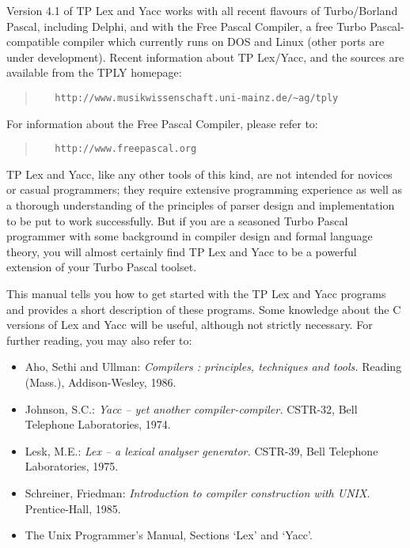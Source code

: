Version 4.1 of TP Lex and Yacc works with all recent flavours of Turbo/Borland
Pascal, including Delphi, and with the Free Pascal Compiler, a free Turbo
Pascal-compatible compiler which currently runs on DOS and Linux (other ports
are under development). Recent information about TP Lex/Yacc, and the sources
are available from the TPLY homepage:
\begin{quote}\begin{verbatim}
   http://www.musikwissenschaft.uni-mainz.de/~ag/tply
\end{verbatim}\end{quote}
For information about the Free Pascal Compiler, please refer to:
\begin{quote}\begin{verbatim}
   http://www.freepascal.org
\end{verbatim}\end{quote}

TP Lex and Yacc, like any other tools of this kind, are not intended for
novices or casual programmers; they require extensive programming experience
as well as a thorough understanding of the principles of parser design and
implementation to be put to work successfully. But if you are a seasoned
Turbo Pascal programmer with some background in compiler design and formal
language theory, you will almost certainly find TP Lex and Yacc to be a
powerful extension of your Turbo Pascal toolset.

This manual tells you how to get started with the TP Lex and Yacc programs
and provides a short description of these programs. Some knowledge about
the C versions of Lex and Yacc will be useful, although not strictly
necessary. For further reading, you may also refer to:

\begin{itemize}
   \item
      Aho, Sethi and Ullman: {\em Compilers : principles, techniques and
      tools.\/} Reading (Mass.), Addison-Wesley, 1986.
   \item
      Johnson, S.C.: {\em Yacc -- yet another compiler-compiler.\/} CSTR-32,
      Bell Telephone Laboratories, 1974.
   \item
      Lesk, M.E.: {\em Lex -- a lexical analyser generator.\/} CSTR-39, Bell
      Telephone Laboratories, 1975.
   \item
      Schreiner, Friedman: {\em Introduction to compiler construction with
      UNIX.\/} Prentice-Hall, 1985.
   \item
      The Unix Programmer's Manual, Sections `Lex' and `Yacc'.
\end{itemize}


